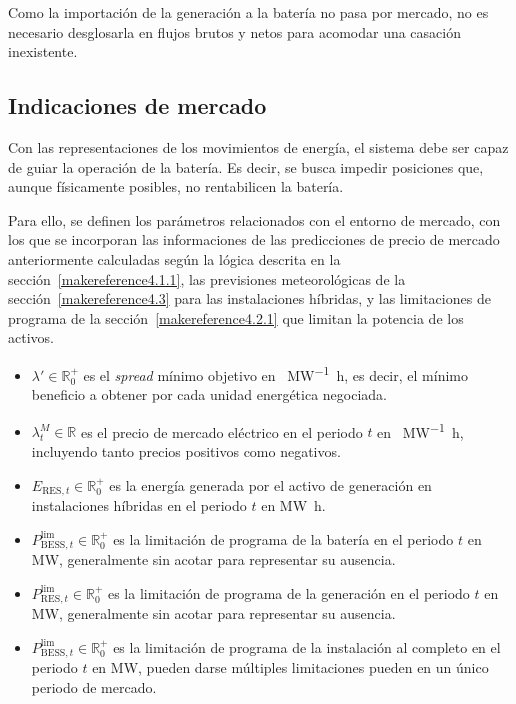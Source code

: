 Como la importación de la generación a la batería no pasa por mercado, no es necesario desglosarla en flujos brutos y netos para acomodar una casación inexistente.

\subsection{Indicaciones de mercado}
\label{makereference5.1.4}

Con las representaciones de los movimientos de energía, el sistema debe ser capaz de guiar la operación de la batería. Es decir, se busca impedir posiciones que, aunque físicamente posibles, no rentabilicen la batería.

Para ello, se definen los parámetros relacionados con el entorno de mercado, con los que se incorporan las informaciones de las predicciones de precio de mercado anteriormente calculadas según la lógica descrita en la sección~\ref{makereference4.1.1}, las previsiones meteorológicas de la sección~\ref{makereference4.3} para las instalaciones híbridas, y las limitaciones de programa de la sección~\ref{makereference4.2.1} que limitan la potencia de los activos.

\begin{itemize}

  \item \( \lambda' \in \mathbb{R}^{+}_{0} \) es el \textit{spread} mínimo objetivo en \si{\text{\euro}\per\mega\watt\hour}, es decir, el mínimo beneficio a obtener por cada unidad energética negociada.

  \item \( \lambda^{M}_{t} \in \mathbb{R} \) es el precio de mercado eléctrico en el periodo \( t \) en \si{\text{\euro}\per\mega\watt\hour}, incluyendo tanto precios positivos como negativos.

  \item \( E_{\text{RES}, t} \in \mathbb{R}^{+}_{0} \) es la energía generada por el activo de generación en instalaciones híbridas en el periodo \( t \) en \si{{\mega\watt\hour}}.

  \item \( P^{\text{lim}}_{\text{BESS}, t} \in \mathbb{R}^{+}_{0} \) es la limitación de programa de la batería en el periodo \( t \) en \si{\mega\watt}, generalmente sin acotar para representar su ausencia.

  \item \( P^{\text{lim}}_{\text{RES}, t} \in \mathbb{R}^{+}_{0} \) es la limitación de programa de la generación en el periodo \( t \) en \si{\mega\watt}, generalmente sin acotar para representar su ausencia.

  \item \( P^{\text{lim}}_{\text{BESS}, t} \in \mathbb{R}^{+}_{0} \) es la limitación de programa de la instalación al completo en el periodo \( t \) en \si{\mega\watt}, pueden darse múltiples limitaciones pueden en un único periodo de mercado.

\end{itemize}


